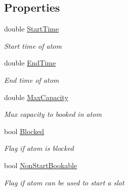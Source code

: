 \subsection*{Properties}
\begin{DoxyCompactItemize}
\item 
double \hyperlink{class_general_health_care_elements_1_1_booking_models_1_1_time_atom_config_ae73eba8913d694592d2e173bcd005369}{Start\+Time}
\begin{DoxyCompactList}\small\item\em Start time of atom \end{DoxyCompactList}\item 
double \hyperlink{class_general_health_care_elements_1_1_booking_models_1_1_time_atom_config_a85a675effc75d84dfe1f7de543837475}{End\+Time}
\begin{DoxyCompactList}\small\item\em End time of atom \end{DoxyCompactList}\item 
double \hyperlink{class_general_health_care_elements_1_1_booking_models_1_1_time_atom_config_a81d7ce52b1dba5084fe66b7ef7f941d9}{Max\+Capacity}
\begin{DoxyCompactList}\small\item\em Max capacity to booked in atom \end{DoxyCompactList}\item 
bool \hyperlink{class_general_health_care_elements_1_1_booking_models_1_1_time_atom_config_abb02070868696dca8963964b971d1551}{Blocked}
\begin{DoxyCompactList}\small\item\em Flag if atom is blocked \end{DoxyCompactList}\item 
bool \hyperlink{class_general_health_care_elements_1_1_booking_models_1_1_time_atom_config_a6e515c1f0e15d2b091dec57ef434543b}{Non\+Start\+Bookable}
\begin{DoxyCompactList}\small\item\em Flag if atom can be used to start a slot \end{DoxyCompactList}\end{DoxyCompactItemize}


